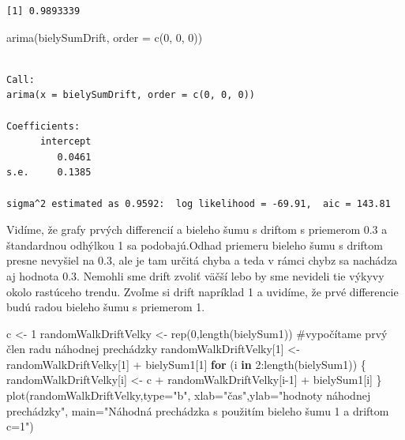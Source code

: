 \documentclass[
  letterpaper,
  DIV=11,
  numbers=noendperiod]{scrreprt}
\newenvironment{Shaded}{\begin{snugshade}}{\end{snugshade}}
\newcommand{\AttributeTok}[1]{\textcolor[rgb]{0.40,0.45,0.13}{#1}}
\newcommand{\CommentTok}[1]{\textcolor[rgb]{0.37,0.37,0.37}{#1}}
\newcommand{\ControlFlowTok}[1]{\textcolor[rgb]{0.00,0.23,0.31}{\textbf{#1}}}
\newcommand{\DecValTok}[1]{\textcolor[rgb]{0.68,0.00,0.00}{#1}}
\newcommand{\FunctionTok}[1]{\textcolor[rgb]{0.28,0.35,0.67}{#1}}
\newcommand{\NormalTok}[1]{\textcolor[rgb]{0.00,0.23,0.31}{#1}}
\newcommand{\OtherTok}[1]{\textcolor[rgb]{0.00,0.23,0.31}{#1}}
\newcommand{\SpecialCharTok}[1]{\textcolor[rgb]{0.37,0.37,0.37}{#1}}
\newcommand{\StringTok}[1]{\textcolor[rgb]{0.13,0.47,0.30}{#1}}
\begin{document}
\begin{verbatim}
[1] 0.9893339
\end{verbatim}

\begin{Shaded}
\begin{Highlighting}[]
\FunctionTok{arima}\NormalTok{(bielySumDrift, }\AttributeTok{order =} \FunctionTok{c}\NormalTok{(}\DecValTok{0}\NormalTok{, }\DecValTok{0}\NormalTok{, }\DecValTok{0}\NormalTok{))}
\end{Highlighting}
\end{Shaded}

\begin{verbatim}

Call:
arima(x = bielySumDrift, order = c(0, 0, 0))

Coefficients:
      intercept
         0.0461
s.e.     0.1385

sigma^2 estimated as 0.9592:  log likelihood = -69.91,  aic = 143.81
\end{verbatim}

Vidíme, že grafy prvých differencií a bieleho šumu s driftom s priemerom
0.3 a štandardnou odhýlkou 1 sa podobajú.Odhad priemeru bieleho šumu s
driftom presne nevyšiel na 0.3, ale je tam určitá chyba a teda v rámci
chybz sa nachádza aj hodnota 0.3. Nemohli sme drift zvoliť väčší lebo by
sme nevideli tie výkyvy okolo rastúceho trendu. Zvoľme si drift
napríklad 1 a uvidíme, že prvé differencie budú radou bieleho šumu s
priemerom 1.

\begin{Shaded}
\begin{Highlighting}[]
\NormalTok{c }\OtherTok{\textless{}{-}} \DecValTok{1}
\NormalTok{randomWalkDriftVelky }\OtherTok{\textless{}{-}} \FunctionTok{rep}\NormalTok{(}\DecValTok{0}\NormalTok{,}\FunctionTok{length}\NormalTok{(bielySum1))}
\CommentTok{\#vypočítame prvý člen radu náhodnej prechádzky }
\NormalTok{randomWalkDriftVelky[}\DecValTok{1}\NormalTok{] }\OtherTok{\textless{}{-}}\NormalTok{ randomWalkDriftVelky[}\DecValTok{1}\NormalTok{] }\SpecialCharTok{+}\NormalTok{ bielySum1[}\DecValTok{1}\NormalTok{]}
\ControlFlowTok{for}\NormalTok{ (i }\ControlFlowTok{in} \DecValTok{2}\SpecialCharTok{:}\FunctionTok{length}\NormalTok{(bielySum1)) \{}
\NormalTok{    randomWalkDriftVelky[i] }\OtherTok{\textless{}{-}}\NormalTok{ c }\SpecialCharTok{+}\NormalTok{ randomWalkDriftVelky[i}\DecValTok{{-}1}\NormalTok{] }\SpecialCharTok{+}\NormalTok{ bielySum1[i]}
\NormalTok{\}}
\FunctionTok{plot}\NormalTok{(randomWalkDriftVelky,}\AttributeTok{type=}\StringTok{"b"}\NormalTok{, }\AttributeTok{xlab=}\StringTok{"čas"}\NormalTok{,}\AttributeTok{ylab=}\StringTok{"hodnoty náhodnej prechádzky"}\NormalTok{, }\AttributeTok{main=}\StringTok{"Náhodná prechádzka s použitím bieleho šumu 1 a driftom c=1"}\NormalTok{)}
\end{Highlighting}
\end{Shaded}
\end{document}
